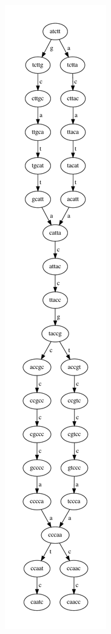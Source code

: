 \documentclass[a4paper,12pt, oneside]{book}
\begin{document}
\begin{figure}
  \centering
  \includegraphics[scale = 0.38]{img/mut.pdf}

\end{figure}
\end{document}
